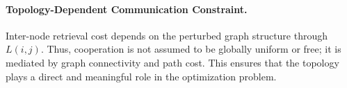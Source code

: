 \paragraph{Topology-Dependent Communication Constraint.}
Inter-node retrieval cost depends on the perturbed graph structure through \(L(i,j)\). Thus, cooperation is not assumed to be globally uniform or free; it is mediated by graph connectivity and path cost. This ensures that the topology plays a direct and meaningful role in the optimization problem.